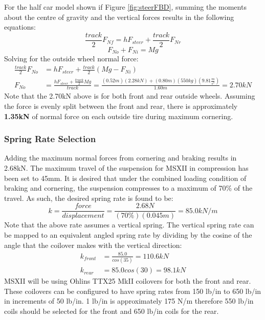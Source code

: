 \documentclass[12pt]{article}
\begin{document}
\noindent For the half car model shown if Figure \ref{fig:steerFBD}, summing the moments about the centre of gravity and the vertical forces results in the following equations: 
\begin{equation}
	\frac{track}{2}F_{Nf} = hF_{steer} + \frac{track}{2}F_{Nr}
\end{equation}
\begin{equation}
	F_{No} + F_{Ni} = Mg
\end{equation}
Solving for the outside wheel normal force: 
\begin{equation}
\begin{split}
	\frac{track}{2}F_{No} &= hF_{steer} + \frac{track}{2}(Mg - F_{Ni})\\
	F_{No} &= \frac{hF_{steer} + \frac{track}{2}Mg}{track} = \frac{(0.52m)(2.28kN)+(0.80m)(550kg)\left(9.81\frac{m}{s^2}\right)}{1.60m} = 2.70kN
\end{split}
\end{equation}
Note that the 2.70kN above is for both front and rear outside wheels. Assuming the force is evenly split between the front and rear, there is approximately \textbf{1.35kN} of normal force on each outside tire during maximum cornering. 
\subsubsection{Spring Rate Selection}
Adding the maximum normal forces from cornering and braking results in 2.68kN. The maximum travel of the suspension for MSXII in compression has been set to 45mm. It is desired that under the combined loading condition of braking and cornering, the suspension compresses to a maximum of 70\% of the travel. As such, the desired spring rate is found to be: 
\begin{equation}
	k = \frac{force}{displacement} = \frac{2.68N}{(70\%)(0.045m)} = 85.0kN/m
\end{equation}
Note that the above rate assumes a vertical spring. The vertical spring rate can be mapped to an equivalent angled spring rate by dividing by the cosine of the angle that the coilover makes with the vertical direction: 
\begin{equation}
	\begin{split}
		k_{front} &= \frac{85.0}{cos(35)} = 110.6kN \\
		k_{rear} &= {85.0}{cos(30)} = 98.1kN
	\end{split}
\end{equation}
MSXII will be using Ohlins TTX25 MkII coilovers for both the front and rear. These coilovers can be configured to have spring rates from 150 lb/in to 650 lb/in in increments of 50 lb/in. 1 lb/in is approximately 175 N/m therefore 550 lb/in coils should be selected for the front and 650 lb/in coils for the rear. 
\end{document}
